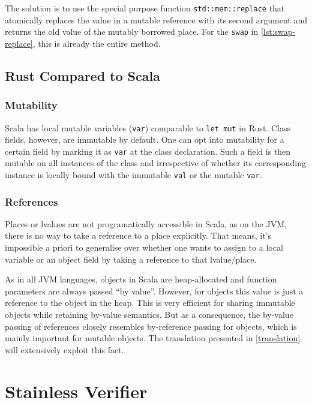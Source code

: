 The solution is to use the special purpose function
\lstinline!std::mem::replace! that atomically replaces the value in a mutable
reference with its second argument and returns the old value of the mutably
borrowed place. For the \lstinline!swap! in \autoref{lst:swap-replace}, this is
already the entire method.


\subsection{Rust Compared to Scala}

\subsubsection{Mutability}

Scala has local mutable variables (\lstinline!var!) comparable to
\passthrough{\lstinline!let mut!} in Rust. Class fields, however, are immutable
by default. One can opt into mutability for a certain field by marking it as
\lstinline!var! at the class declaration. Such a field is then mutable on all
instances of the class and irrespective of whether its corresponding instance is
locally bound with the immutable \lstinline!val! or the mutable \lstinline!var!.

\subsubsection{References}

Places or lvalues are not programatically accessible in Scala, as on the JVM,
there is no way to take a reference to a place explicitly. That means,
it's impossible a priori to generalise over whether one wants to assign to a local
variable or an object field by taking a reference to that lvalue/place.

As in all JVM languages, objects in Scala are heap-allocated and function
parameters are always passed ``by value''. However, for objects this value is
just a reference to the object in the heap. This is very efficient for sharing
immutable objects while retaining by-value semantics. But as a consequence, the
by-value passing of references closely resembles by-reference passing for
objects, which is mainly important for mutable objects. The translation
presented in \autoref{translation} will extensively exploit this fact.


\section{Stainless Verifier}

